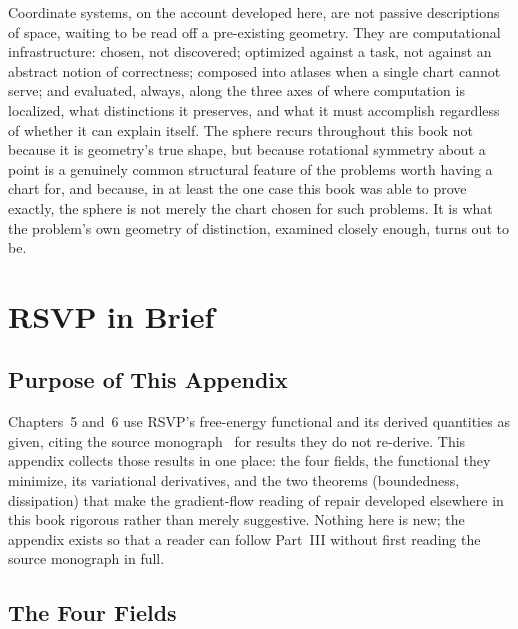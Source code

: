 \documentclass[11pt,fleqn]{book}
\numberwithin{equation}{chapter}
\theoremstyle{plain}
\theoremstyle{definition}
\theoremstyle{remark}
\begin{document}
Coordinate systems, on the account developed here, are not passive descriptions of space, waiting to be read off a pre-existing geometry. They are computational infrastructure: chosen, not discovered; optimized against a task, not against an abstract notion of correctness; composed into atlases when a single chart cannot serve; and evaluated, always, along the three axes of where computation is localized, what distinctions it preserves, and what it must accomplish regardless of whether it can explain itself. The sphere recurs throughout this book not because it is geometry's true shape, but because rotational symmetry about a point is a genuinely common structural feature of the problems worth having a chart for, and because, in at least the one case this book was able to prove exactly, the sphere is not merely the chart chosen for such problems. It is what the problem's own geometry of distinction, examined closely enough, turns out to be.


\appendix


\chapter{RSVP in Brief}

\section{Purpose of This Appendix}

Chapters~5 and~6 use RSVP's free-energy functional and its derived quantities as given, citing the source monograph~\cite{holonomic} for results they do not re-derive. This appendix collects those results in one place: the four fields, the functional they minimize, its variational derivatives, and the two theorems (boundedness, dissipation) that make the gradient-flow reading of repair developed elsewhere in this book rigorous rather than merely suggestive. Nothing here is new; the appendix exists so that a reader can follow Part~III without first reading the source monograph in full.

\section{The Four Fields}
\end{document}
